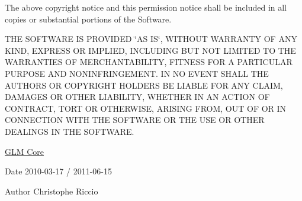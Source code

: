 \-The above copyright notice and this permission notice shall be included in all copies or substantial portions of the \-Software.

\-T\-H\-E \-S\-O\-F\-T\-W\-A\-R\-E \-I\-S \-P\-R\-O\-V\-I\-D\-E\-D \char`\"{}\-A\-S I\-S\char`\"{}, \-W\-I\-T\-H\-O\-U\-T \-W\-A\-R\-R\-A\-N\-T\-Y \-O\-F \-A\-N\-Y \-K\-I\-N\-D, \-E\-X\-P\-R\-E\-S\-S \-O\-R \-I\-M\-P\-L\-I\-E\-D, \-I\-N\-C\-L\-U\-D\-I\-N\-G \-B\-U\-T \-N\-O\-T \-L\-I\-M\-I\-T\-E\-D \-T\-O \-T\-H\-E \-W\-A\-R\-R\-A\-N\-T\-I\-E\-S \-O\-F \-M\-E\-R\-C\-H\-A\-N\-T\-A\-B\-I\-L\-I\-T\-Y, \-F\-I\-T\-N\-E\-S\-S \-F\-O\-R \-A \-P\-A\-R\-T\-I\-C\-U\-L\-A\-R \-P\-U\-R\-P\-O\-S\-E \-A\-N\-D \-N\-O\-N\-I\-N\-F\-R\-I\-N\-G\-E\-M\-E\-N\-T. \-I\-N \-N\-O \-E\-V\-E\-N\-T \-S\-H\-A\-L\-L \-T\-H\-E \-A\-U\-T\-H\-O\-R\-S \-O\-R \-C\-O\-P\-Y\-R\-I\-G\-H\-T \-H\-O\-L\-D\-E\-R\-S \-B\-E \-L\-I\-A\-B\-L\-E \-F\-O\-R \-A\-N\-Y \-C\-L\-A\-I\-M, \-D\-A\-M\-A\-G\-E\-S \-O\-R \-O\-T\-H\-E\-R \-L\-I\-A\-B\-I\-L\-I\-T\-Y, \-W\-H\-E\-T\-H\-E\-R \-I\-N \-A\-N \-A\-C\-T\-I\-O\-N \-O\-F \-C\-O\-N\-T\-R\-A\-C\-T, \-T\-O\-R\-T \-O\-R \-O\-T\-H\-E\-R\-W\-I\-S\-E, \-A\-R\-I\-S\-I\-N\-G \-F\-R\-O\-M, \-O\-U\-T \-O\-F \-O\-R \-I\-N \-C\-O\-N\-N\-E\-C\-T\-I\-O\-N \-W\-I\-T\-H \-T\-H\-E \-S\-O\-F\-T\-W\-A\-R\-E \-O\-R \-T\-H\-E \-U\-S\-E \-O\-R \-O\-T\-H\-E\-R \-D\-E\-A\-L\-I\-N\-G\-S \-I\-N \-T\-H\-E \-S\-O\-F\-T\-W\-A\-R\-E.

\hyperlink{group__core}{\-G\-L\-M \-Core}

\begin{DoxyDate}{\-Date}
2010-\/03-\/17 / 2011-\/06-\/15 
\end{DoxyDate}
\begin{DoxyAuthor}{\-Author}
\-Christophe \-Riccio 
\end{DoxyAuthor}
